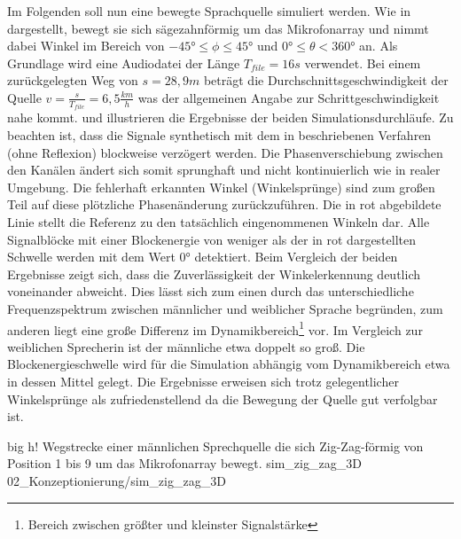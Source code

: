 Im Folgenden soll nun eine bewegte Sprachquelle simuliert werden. Wie in  dargestellt, bewegt sie sich sägezahnförmig um das Mikrofonarray und nimmt dabei Winkel im Bereich von $-45° \leq \phi \leq 45°$ und $0° \leq \theta < 360°$ an. Als Grundlage wird eine Audiodatei der Länge $T_{file}=16s$ verwendet. Bei einem zurückgelegten Weg von $s=28,9m$ beträgt die Durchschnittsgeschwindigkeit der Quelle $v=\frac{s}{T_{file}} = 6,5 \frac{km}{h}$ was der allgemeinen Angabe zur Schrittgeschwindigkeit nahe kommt.
 und  illustrieren die Ergebnisse der beiden Simulationsdurchläufe. Zu beachten ist, dass die Signale synthetisch mit dem in  beschriebenen Verfahren (ohne Reflexion) blockweise verzögert werden. Die Phasenverschiebung zwischen den Kanälen ändert sich somit sprunghaft und nicht kontinuierlich wie in realer Umgebung. Die fehlerhaft erkannten Winkel (Winkelsprünge) sind zum großen Teil auf diese plötzliche Phasenänderung zurückzuführen. Die in rot abgebildete Linie stellt die Referenz zu den tatsächlich eingenommenen Winkeln dar. Alle Signalblöcke mit einer Blockenergie von weniger als der in rot dargestellten Schwelle werden mit dem Wert $0°$ detektiert. Beim Vergleich der beiden Ergebnisse zeigt sich, dass  die Zuverlässigkeit der Winkelerkennung deutlich voneinander abweicht. Dies lässt sich zum einen durch das unterschiedliche Frequenzspektrum zwischen männlicher und weiblicher Sprache begründen, zum anderen liegt eine große Differenz im Dynamikbereich\footnote{Bereich zwischen größter und kleinster Signalstärke} vor. Im Vergleich zur weiblichen Sprecherin ist der männliche etwa doppelt so groß. Die Blockenergieschwelle wird für die Simulation abhängig vom Dynamikbereich etwa in dessen Mittel gelegt. Die Ergebnisse erweisen sich trotz gelegentlicher Winkelsprünge als zufriedenstellend da die Bewegung der Quelle gut verfolgbar ist.



         {big}                                                       %
         {h!}                                                  %
         {Wegstrecke einer männlichen Sprechquelle die sich Zig-Zag-förmig von Position 1 bis 9 um das Mikrofonarray bewegt.}    %
         {sim_zig_zag_3D}                                               %
         {02_Konzeptionierung/sim_zig_zag_3D}    




